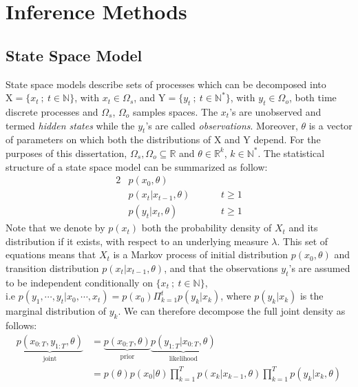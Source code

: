 \documentclass[12pt]{article}
\begin{document}
	\section{Inference Methods}
	\subsection{State Space Model}
	State space models describe sets of processes which can be decomposed into $\mathrm{X}=\{x_t \ ; \ t \in \mathbb{N}\}$, with $x_t \in \Omega_s$, and $\mathrm{Y}=\{y_t \ ; \ t \in \mathbb{N^*}\}$, with $y_t \in \Omega_o$, both time discrete processes and $\Omega_s$, $\Omega_o$ samples spaces. The $x_t$'s are unobserved and termed \emph{hidden states} while the $y_t$'s are called \emph{observations}. Moreover, $\theta$ is a vector of parameters on which both the distributions of $\mathrm{X}$ and $\mathrm{Y}$ depend. For the purposes of this dissertation, $\Omega_s, \Omega_o \subseteq \mathbb{R}$ and $\theta \in \mathbb{R}^k$, $k \in \mathbb{N^*}$. The statistical structure of a state space model can be summarized as follow: 
	\begin{alignat}{2}
	& p(x_0, \theta) &\\
	& p(x_t | x_{t-1}, \theta) \hspace{1cm} & t \ge 1\\
	& p(y_t | x_t, \theta)  & t \ge 1
	\end{alignat}
	Note that we denote by $p(x_t)$ both the probability density of $X_t$ and its distribution if it exists, with respect to an underlying measure $\lambda$. This set of equations means that $X_t$ is a Markov process of initial distribution $p(x_0, \theta)$ and transition distribution $p(x_t | x_{t-1}, \theta)$, and that the observations $y_t$'s are assumed to be independent conditionally on $\{x_t \ ; \ t \in \mathbb{N}\}$, \\ i.e $p(y_1, \cdots, y_t | x_0, \cdots, x_t) =p(x_0)\Pi_{k=1}^t p(y_k | x_k)$, where $p(y_k | x_k)$ is the marginal distribution of $y_k$. We can therefore decompose the full joint density as follows:
	\begin{align}
	\underbrace{p(x_{0:T}, y_{1:T}, \theta)}_{\text{joint}} & = \underbrace{p(x_{0:T}, \theta)}_{\text{prior}}\underbrace{p(y_{1:T}| x_{0:T}, \theta)}_{\text{likelihood}} \\
		& = p(\theta)p(x_0| \theta)\prod_{k=1}^{T}p(x_k|x_{k-1}, \theta)\prod_{k=1}^{T}p(y_k|x_k, \theta)
	\end{align}\\
	
\end{document}
